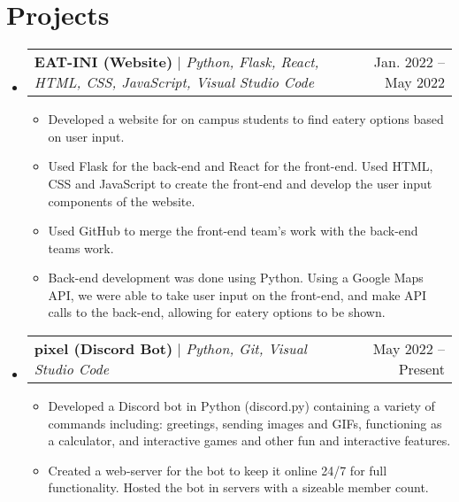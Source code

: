\documentclass[letterpaper,11pt]{article}
\makeatletter
\newcommand{\resumeItem}[1]{
  \item\small{
    {#1 \vspace{-5pt}}
  }
}
\newcommand{\resumeProjectHeading}[2]{
    \item
    \begin{tabular*}{0.97\textwidth}{l@{\extracolsep{\fill}}r}
      \small#1 & #2 \\
    \end{tabular*}\vspace{-8pt}
}
\newcommand{\resumeSubHeadingListStart}{\begin{itemize}[leftmargin=0.10in, label={}]}
\newcommand{\resumeSubHeadingListEnd}{\end{itemize}}
\newcommand{\resumeItemListStart}{\begin{itemize}}
\newcommand{\resumeItemListEnd}{\end{itemize}\vspace{-5pt}}
\makeatother
\begin{document}
\section{Projects}
    \resumeSubHeadingListStart
      \resumeProjectHeading
          {\textbf{EAT-INI (Website)} $|$ \emph{Python, Flask, React, HTML, CSS, JavaScript, Visual Studio Code}}{Jan. 2022 -- May 2022}
          \resumeItemListStart
            \resumeItem{Developed a website for on campus students to find eatery options based on user input.}
            \resumeItem{Used Flask for the back-end and React for the front-end. Used HTML, CSS and JavaScript to create the front-end and develop the user input components of the website.}
            \resumeItem{Used GitHub to merge the front-end team's work with the back-end teams work.}
            \resumeItem{Back-end development was done using Python. Using a Google Maps API, we were able to take user input on the front-end, and make API calls to the back-end, allowing for eatery options to be shown.}
          \resumeItemListEnd
      \resumeProjectHeading
          {\textbf{pixel (Discord Bot)} $|$ \emph{Python, Git, Visual Studio Code}}{May 2022 -- Present}
          \resumeItemListStart
            \resumeItem{Developed a Discord bot in Python (discord.py) containing a variety of commands including: greetings, sending images and GIFs, functioning as a calculator, and interactive games and other fun and interactive features.}
            \resumeItem{Created a web-server for the bot to keep it online 24/7 for full functionality. Hosted the bot in servers with a sizeable member count.}
          \resumeItemListEnd
    \resumeSubHeadingListEnd

\end{document}
